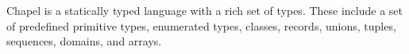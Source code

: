 Chapel is a statically typed language with a rich set of types.  These
include a set of predefined primitive types, enumerated types,
classes, records, unions, tuples, sequences, domains, and arrays.
